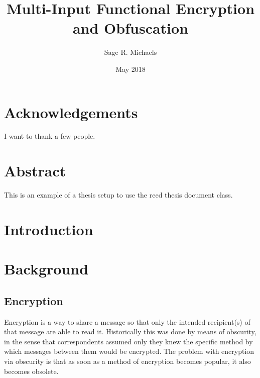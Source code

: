 \documentclass[12pt,twoside]{reedthesis}
\title{Multi-Input Functional Encryption and Obfuscation}
\author{Sage R. Michaels}
\date{May 2018}
\begin{document}
  \maketitle
  \frontmatter %
  \pagestyle{empty} %

    \chapter*{Acknowledgements}
	I want to thank a few people.

    \chapter*{Abstract}
	This is an example of a thesis setup to use the reed thesis document class.
	

    \tableofcontents
    
 
  \mainmatter %
  \pagestyle{fancyplain} %
    
     \chapter*{Introduction}
	        
    
    \chapter{Background}
    \section{Encryption}
    Encryption is a way to share a message so that only the intended recipient(s) of
    that message are able to read it. Historically this was done by means of obscurity, in the sense that correspondents assumed only they knew the specific method by which messages between them would be encrypted. The problem with encryption via obscurity is that as soon as a method of encryption becomes popular, it also becomes obsolete.
\end{document}

